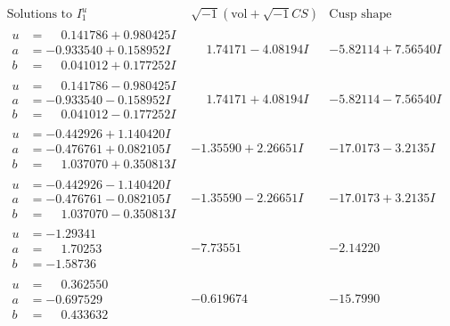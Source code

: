 \documentclass[1p]{elsarticle_modified}
\theoremstyle{definition}
\newcommand{\I}{\sqrt{-1}}
\begin{document}
$$\begin{array}{c|c|c}  
\text{Solutions to }I^u_{1}& \I (\text{vol} + \sqrt{-1}CS) & \text{Cusp shape}\\
 \hline 
\begin{aligned}
u &= \phantom{-}0.141786 + 0.980425 I \\
a &= -0.933540 + 0.158952 I \\
b &= \phantom{-}0.041012 + 0.177252 I\end{aligned}
 & \phantom{-}1.74171 - 4.08194 I & -5.82114 + 7.56540 I \\ \hline\begin{aligned}
u &= \phantom{-}0.141786 - 0.980425 I \\
a &= -0.933540 - 0.158952 I \\
b &= \phantom{-}0.041012 - 0.177252 I\end{aligned}
 & \phantom{-}1.74171 + 4.08194 I & -5.82114 - 7.56540 I \\ \hline\begin{aligned}
u &= -0.442926 + 1.140420 I \\
a &= -0.476761 + 0.082105 I \\
b &= \phantom{-}1.037070 + 0.350813 I\end{aligned}
 & -1.35590 + 2.26651 I & -17.0173 - 3.2135 I \\ \hline\begin{aligned}
u &= -0.442926 - 1.140420 I \\
a &= -0.476761 - 0.082105 I \\
b &= \phantom{-}1.037070 - 0.350813 I\end{aligned}
 & -1.35590 - 2.26651 I & -17.0173 + 3.2135 I \\ \hline\begin{aligned}
u &= -1.29341\phantom{ +0.000000I} \\
a &= \phantom{-}1.70253\phantom{ +0.000000I} \\
b &= -1.58736\phantom{ +0.000000I}\end{aligned}
 & -7.73551\phantom{ +0.000000I} & -2.14220\phantom{ +0.000000I} \\ \hline\begin{aligned}
u &= \phantom{-}0.362550\phantom{ +0.000000I} \\
a &= -0.697529\phantom{ +0.000000I} \\
b &= \phantom{-}0.433632\phantom{ +0.000000I}\end{aligned}
 & -0.619674\phantom{ +0.000000I} & -15.7990\phantom{ +0.000000I} \\ \hline\begin{aligned}

\end{aligned}
\end{array}$$
\end{document}
